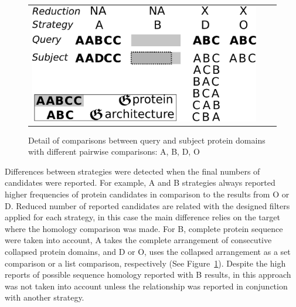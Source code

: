 \documentclass[11pt]{article}
\begin{document}
\begin{figure}
  \begin{tabular}{lcr}
    \begin{minipage}{0.55\textwidth}
    \centering
    \includegraphics[scale=0.4]{figures/ABDO}
    \end{minipage}
    & \qquad &
    \begin{minipage}{0.35\textwidth}
      \caption{Detail of comparisons between query and subject protein domains with 
      different pairwise comparisons: A, B, D, O}\label{fig:ABDO}
    \end{minipage}
  \end{tabular}
\end{figure}


Differences between strategies were detected when the final numbers of candidates were
 reported. For example, A and B strategies always reported higher frequencies of 
protein candidates in comparison to the results from O or D. Reduced number of
reported candidates are related with the designed filters applied for each
strategy, in this case the main difference relies on the target where the
homology comparison was made. For B, complete protein sequence were taken into
account, A takes the complete arrangement of consecutive collapsed protein domains,
and D or O, uses the collapsed arrangement as a set comparison or a 
list comparison, respectively (See Figure~\ref{fig:ABDO}). Despite the high reports of
possible sequence homology reported with B results, in this approach was not taken
into account unless the relationship was reported in conjunction with another strategy.
\end{document}
